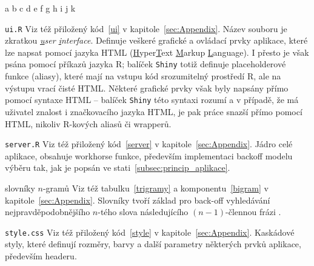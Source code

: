 \begin{labeling}{a b c d e f g h i j k}

  \item [\texttt{ui.R}] Viz též přiložený kód~\ref{ui} v kapitole~\ref{sec:Appendix}.
  Název souboru je zkratkou
  \textit{\underline{u}ser \underline{i}nterface}. Definuje veškeré grafické
  a ovládací prvky aplikace, které lze napsat pomocí jazyka HTML
  (\underline{H}yper\underline{T}ext \underline{M}arkup \underline{L}anguage).
  I přesto je však psána pomocí příkazů jazyka \textsf{R}; balíček
  \texttt{Shiny} totiž definuje placeholderové funkce (aliasy), které mají na
  vstupu kód srozumitelný prostředí \textsf{R}, ale na výstupu vrací čisté
  HTML. Některé grafické prvky však byly napsány přímo pomocí syntaxe HTML%
  -- balíček \texttt{Shiny} této syntaxi rozumí a v případě, že má uživatel
  znalost i značkovacího jazyka HTML, je pak práce snazší přímo pomocí HTML,
  nikoliv \mbox{\textsf{R}-kových} aliasů či wrapperů.
  
  \item [\texttt{server.R}] Viz též přiložený kód~\ref{server} v kapitole~\ref{sec:Appendix}.
  Jádro celé aplikace,
  obsahuje workhorse funkce, především implementaci backoff modelu výběru tak,
  jak je popsán ve stati~\ref{subsec:princip_aplikace}.
  
  \item [slovníky $n$-gramů] Viz též tabulku~\ref{trigramy}
  a komponentu~\ref{bigram} v kapitole~\ref{sec:Appendix}.
  Slovníky tvoří základ pro back-off vyhledávání%
  nejpravděpodobnějšího $n$-tého slova následujícího $(n - 1)$-člennou frázi%
  .
 
  \item [\texttt{style.css}] Viz též přiložený kód~\ref{style} v kapitole~\ref{sec:Appendix}.
  Kaskádové styly, které
  definují rozměry, barvy a další parametry některých prvků aplikace, především
  headeru.

  
\end{labeling}


\newpage








